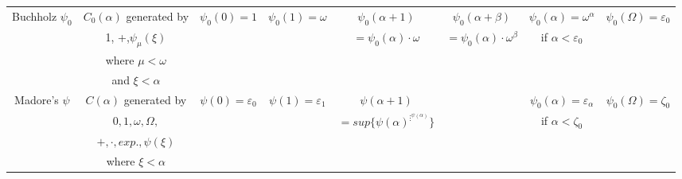 \documentclass[10pt]{article}
\begin{document}
\begin{tabular}{|c|c|c|c|c|c|c|c|} \hline

Buchholz \(\psi_0\)& \(C_0(\alpha)\) generated by & \(\psi_0(0)=1\)         & \(\psi_0(1)=\omega\)    & \(\psi_0(\alpha+1)\)           &\(\psi_0(\alpha+\beta)\)             & \(\psi_0(\alpha)=\omega^\alpha\)    &\(\psi_0(\Omega)=\varepsilon_0\)\\
                   & 1, +,\(\psi_\mu(\xi)\)       &                         &                         & \(=\psi_0(\alpha)\cdot\omega\)&\(=\psi_0(\alpha)\cdot\omega^\beta\)& if \(\alpha<\varepsilon_0\)         &                                \\
                   & where \( \mu < \omega \)     &                         &                         &                                &                                     &                                     &                                \\
                   & and \( \xi < \alpha \)       &                         &                         &                                &                                     &                                     &                                \\ 
\hline

Madore's \(\psi\)  & \(C(\alpha)\) generated by   &\(\psi(0)=\varepsilon_0\)&\(\psi(1)=\varepsilon_1\)& \(\psi(\alpha+1)\)             &                                     &\(\psi_0(\alpha)=\varepsilon_\alpha\)& \(\psi_0(\Omega)=\zeta_0\)     \\
                   & \(0,1,\omega,\Omega,\)       &                         &                         & \(=sup\lbrace\psi(\alpha)^{\vdots^{\psi(\alpha)}}\rbrace\) 
                                                                                                                                       &                                     & if \(\alpha<\zeta_0\)               &                                \\
                   & \(+,\cdot,exp.,\psi(\xi)\)  &                         &                         &                                &                                     &                                     &                                \\
                   & where \( \xi < \alpha \)     &                         &                         &                                &                                     &                                     &                                \\
\hline
													
\end{tabular}
\end{document}
